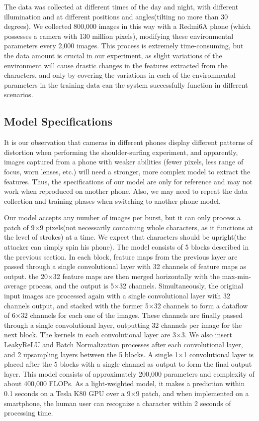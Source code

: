 The data was collected at different times of the day and night, with different illumination and at different positions and angles(tilting no more than 30 degrees). We collected 800,000 images in this way with a Redmi6A phone (which possesses a camera with 130 million pixels), modifying these environmental parameters every 2,000 images. This process is extremely time-consuming, but the data amount is crucial in our experiment, as slight variations of the environment will cause drastic changes in the features extracted from the characters, and only by covering the variations in each of the environmental parameters in the training data can the system successfully function in different scenarios.

\subsection{Model Specifications}
It is our observation that cameras in different phones display different patterns of distortion when performing the shoulder-surfing experiment, and apparently, images captured from a phone with weaker abilities (fewer pixels, less range of focus, worn lenses, etc.) will need a stronger, more complex model to extract the features. Thus, the specifications of our model are only for reference and may not work when reproduced on another phone. Also, we may need to repeat the data collection and training phases when switching to another phone model.

Our model accepts any number of images per burst, but it can only process a patch of 9$\times$9 pixels(not necessarily containing whole characters, as it functions at the level of strokes) at a time. We expect that characters should be upright(the attacker can simply spin his phone). The model consists of 5 blocks described in the previous section. In each block, feature maps from the previous layer are passed through a single convolutional layer with 32 channels of feature maps as output. the 20$\times$32 feature maps are then merged horizontally with the max-min-average process, and the output is 5$\times$32 channels. Simultaneously, the original input images are processed again with a single convolutional layer with 32 channels output, and stacked with the former 5$\times$32 channels to form a dataflow of 6$\times$32 channels for each one of the images. These channels are finally passed through a single convolutional layer, outputting 32 channels per image for the next block. The kernels in each convolutional layer are 3$\times$3. We also insert LeakyReLU and Batch Normalization processes after each convolutional layer, and 2 upsampling layers between the 5 blocks. A single 1$\times$1 convolutional layer is placed after the 5 blocks with a single channel as output to form the final output layer. This model consists of approximately 200,000 parameters and complexity of about 400,000 FLOPs. As a light-weighted model, it makes a prediction within 0.1 seconds on a Tesla K80 GPU over a 9$\times$9 patch, and when implemented on a smartphone, the human user can recognize a character within 2 seconds of processing time.